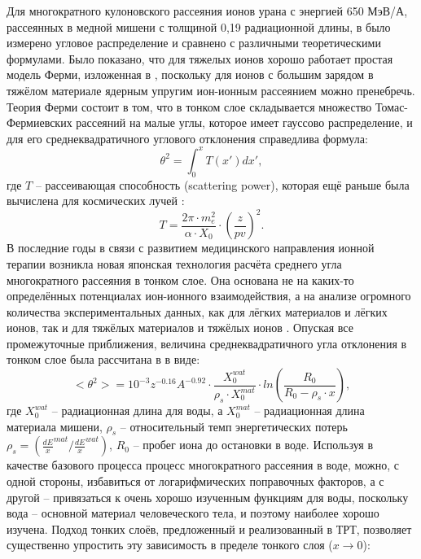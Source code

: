 \documentclass[a4paper,12pt]{article}
\begin{document}
\begin{large}
  Для многократного кулоновского рассеяния ионов урана с энергией 650 МэВ/А, рассеянных в медной мишени с толщиной 0,19 радиационной длины, в \cite{Wong} было измерено угловое распределение и сравнено с различными теоретическими формулами.
  Было показано, что для тяжелых ионов хорошо работает простая модель Ферми, изложенная в \cite{Eyges}, поскольку для ионов с большим зарядом в тяжёлом материале ядерным упругим ион-ионным рассеянием можно пренебречь.
  Теория Ферми состоит в том, что в тонком слое складывается множество Томас-Фермиевских рассеяний на малые углы, которое имеет гауссово распределение, и для его среднеквадратичного углового отклонения справедлива формула:
  \begin{equation}
  \label{Fermi}
  \theta^2=\int_0^x T(x') dx',
  \end{equation}
где $T$ -- рассеивающая способность (scattering power), которая ещё раньше была вычислена для космических лучей \cite{RossiGreisen}:
  \begin{equation}
  \label{Rossi}
  T=\frac{2\pi\cdot m_e^2}{\alpha\cdot X_0}\cdot\left(\frac{z}{pv}\right)^2.
  \end{equation}
  В последние годы в связи с развитием медицинского направления ионной терапии возникла новая японская технология расчёта среднего угла многократного рассеяния в тонком слое.
  Она основана не на каких-то определённых потенциалах ион-ионного взаимодействия, а на анализе огромного количества экспериментальных данных, как для лёгких материалов и лёгких ионов, так и для тяжёлых материалов и тяжёлых ионов \cite{Wong}.
  Опуская все промежуточные приближения, величина среднеквадратичного угла отклонения в тонком слое была рассчитана в \cite{Kanematsu9}  в виде:
  \begin{equation}
  \label{Kane9}
  <\theta^2>=10^{-3}z^{-0.16}A^{-0.92}\cdot\frac{X_0^{wat}}{\rho_s\cdot X_0^{mat}}\cdot ln\left(\frac{R_0}{R_0-\rho_s\cdot x}\right),
  \end{equation}
где $X_0^{wat}$ -- радиационная длина для воды, а $X_0^{mat}$ -- радиационная длина материала мишени, $\rho_s$ -- относительный темп энергетических потерь $\rho_s=\left(\frac{dE}{x}^{mat}/\frac{dE}{x}^{wat}\right)$, $R_0$ -- пробег иона до остановки в воде.
  Используя в качестве базового процесса процесс многократного рассеяния в воде, можно, с одной стороны, избавиться от логарифмических поправочных факторов, а с другой -- привязаться к очень хорошо изученным функциям для воды, поскольку вода -- основной материал человеческого тела, и поэтому наиболее хорошо изучена.
  Подход тонких слоёв, предложенный и реализованный в ТРТ, позволяет существенно упростить эту зависимость в пределе тонкого слоя ($x\longrightarrow 0$):

\end{large}
\end{document}
